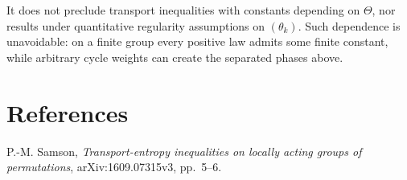 \documentclass[11pt]{article}
\begin{document}
It does not preclude transport inequalities with constants depending on
$\Theta$, nor results under quantitative regularity assumptions on
$(\theta_k)$.  Such dependence is unavoidable: on a finite group every
positive law admits some finite constant, while arbitrary cycle weights can
create the separated phases above.

\section*{References}
{\raggedright
\noindent[1] P.-M. Samson, \emph{Transport-entropy inequalities on locally
acting groups of permutations}, arXiv:1609.07315v3, pp.~5--6.
\par}
\end{document}

